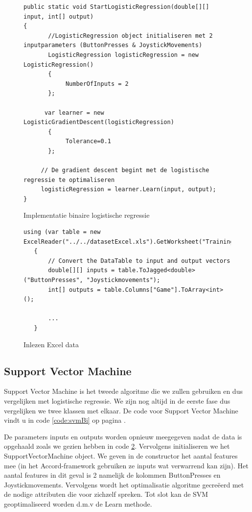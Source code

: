 \begin{figure}[]
	\renewcommand{\figurename}{Code}
\begin{lstlisting}
public static void StartLogisticRegression(double[][] input, int[] output)
{
       //LogisticRegression object initialiseren met 2 inputparameters (ButtonPresses & JoystickMovements)
       LogisticRegression logisticRegression = new LogisticRegression()
       {
       		NumberOfInputs = 2
       };
       
      var learner = new LogisticGradientDescent(logisticRegression)
       {
            Tolerance=0.1
       };
    
     // De gradient descent begint met de logistische regressie te optimaliseren
     logisticRegression = learner.Learn(input, output);
}

\end{lstlisting}
\caption{Implementatie binaire logistische regressie}
\label{code:linaireRegressieTweeKlassen}
\end{figure}
\begin{figure}[]
	\renewcommand{\figurename}{Code}
	\begin{lstlisting}
using (var table = new ExcelReader("../../datasetExcel.xls").GetWorksheet("Training"))
   {
       // Convert the DataTable to input and output vectors
       double[][] inputs = table.ToJagged<double>("ButtonPresses", "Joystickmovements");
       int[] outputs = table.Columns["Game"].ToArray<int>();
       
       ...
   }
	\end{lstlisting}
	\caption{Inlezen Excel data}
	\label{code:dataInlezen}
\end{figure}

\newpage
\subsection{Support Vector Machine}
\label{sec:supportvectormachine}
Support Vector Machine is het tweede algoritme die we zullen gebruiken en dus vergelijken met logistische regressie. 
We zijn nog altijd in de eerste fase dus vergelijken we twee klassen met elkaar. 
De code voor Support Vector Machine vindt u in code \ref{code:svmBi} op pagina \pageref{code:svmBi}. 

De parameters inputs en outputs worden opnieuw meegegeven nadat de data is opgehaald zoals we gezien hebben in code \ref{code:dataInlezen}. Vervolgens initialiseren we het SupportVectorMachine object. We geven in de constructor het aantal features mee (in het Accord-framework gebruiken ze inputs wat verwarrend kan zijn). Het aantal features in dit geval is 2 namelijk de kolommen ButtonPresses en Joystickmovements. Vervolgens wordt het optimalisatie algoritme gecreëerd met de nodige attributen die voor zichzelf spreken. Tot slot kan de SVM geoptimaliseerd worden d.m.v de Learn methode.  

